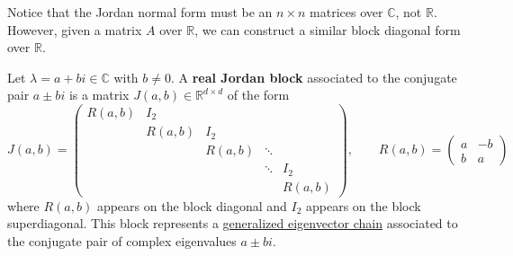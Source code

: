 	Notice that the Jordan normal form must be an $n \times n$ matrices over $\mathbb{C}$, not $\mathbb{R}$. However, given a matrix $A$ over $\mathbb{R}$, we can construct a similar block diagonal form over $\mathbb{R}$. 

	\begin{definition}
	  \label{def:real-jordan-block-for-a-complex-eigenvalue}
		Let $\lambda = a + bi \in \mathbb{C}$ with $b \neq 0$. A \textbf{real Jordan block} associated to the conjugate pair $a \pm bi$ is a matrix $J(a,b) \in \mathbb{R}^{d \times d}$ of the form
		\begin{equation}
			J(a,b) = \begin{pmatrix}
				 R(a,b) & I_2 &  &  & \\
				 & R(a,b) & I_2 &  & \\
				 &  & R(a,b) & \ddots & \\
				 &  &  & \ddots & I_2 \\
				 &  &  &  & R(a,b)
			\end{pmatrix}, \qquad R(a,b) = \begin{pmatrix}
				a & -b \\
				b & a
			\end{pmatrix}
		\end{equation}
		where $R(a,b)$ appears on the block diagonal and $I_2$ appears on the block superdiagonal. This block represents a \hyperref[thm:generalized_eigenvector_chain]{generalized eigenvector chain} associated to the conjugate pair of complex eigenvalues $a \pm bi$.
	\end{definition}
